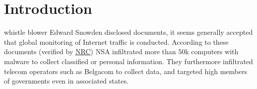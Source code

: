 \documentclass[9pt,journal,compsoc]{IEEEtran}
\begin{document}
\section{Introduction}
%
%



% 
% 
% 
% 
 whistle blower Edward Snowden disclosed documents, it seems generally accepted that global monitoring of Internet traffic is conducted. According to these documents (verified by \href{http://www.nrc.nl/nieuws/2013/11/23/nederland-sinds-1946-doelwit-van-nsa}{NRC}) NSA infiltrated more than 50k computers with malware to collect classified or personal information. They furthermore infiltrated telecom operators such as Belgacom to collect data, and targeted high members of governments even in associated states. 
\end{document}
